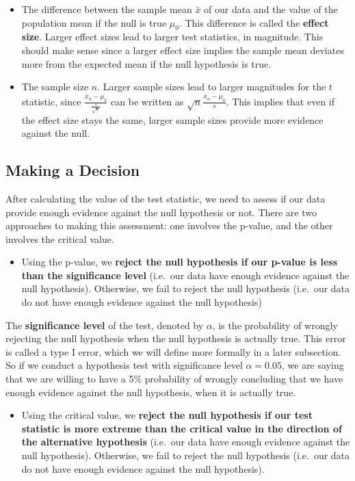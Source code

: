 \documentclass[
]{book}
\providecommand{\tightlist}{%
  \setlength{\itemsep}{0pt}\setlength{\parskip}{0pt}}
\begin{document}
\begin{itemize}
\item
  The difference between the sample mean \(\bar{x}\) of our data and the value of the population mean if the null is true \(\mu_0\). This difference is called the \textbf{effect size}. Larger effect sizes lead to larger test statistics, in magnitude. This should make sense since a larger effect size implies the sample mean deviates more from the expected mean if the null hypothesis is true.
\item
  The sample size \(n\). Larger sample sizes lead to larger magnitudes for the \(t\) statistic, since \(\frac{\bar{x}_n - \mu_0}{\frac{s}{\sqrt{n}}}\) can be written as \(\sqrt{n}\frac{\bar{x}_n - \mu_0}{s}\). This implies that even if the effect size stays the same, larger sample sizes provide more evidence against the null.
\end{itemize}

\subsection{Making a Decision}\label{decision}

After calculating the value of the test statistic, we need to assess if our data provide enough evidence against the null hypothesis or not. There are two approaches to making this assessment: one involves the p-value, and the other involves the critical value.

\begin{itemize}
\tightlist
\item
  Using the p-value, we \textbf{reject the null hypothesis if our p-value is less than the significance level} (i.e.~our data have enough evidence against the null hypothesis). Otherwise, we fail to reject the null hypothesis (i.e.~our data do not have enough evidence against the null hypothesis)
\end{itemize}

The \textbf{significance level} of the test, denoted by \(\alpha\), is the probability of wrongly rejecting the null hypothesis when the null hypothesis is actually true. This error is called a type I error, which we will define more formally in a later subsection. So if we conduct a hypothesis test with significance level \(\alpha = 0.05\), we are saying that we are willing to have a 5\% probability of wrongly concluding that we have enough evidence against the null hypothesis, when it is actually true.

\begin{itemize}
\tightlist
\item
  Using the critical value, we \textbf{reject the null hypothesis if our test statistic is more extreme than the critical value in the direction of the alternative hypothesis} (i.e.~our data have enough evidence against the null hypothesis). Otherwise, we fail to reject the null hypothesis (i.e.~our data do not have enough evidence against the null hypothesis).
\end{itemize}
\end{document}

